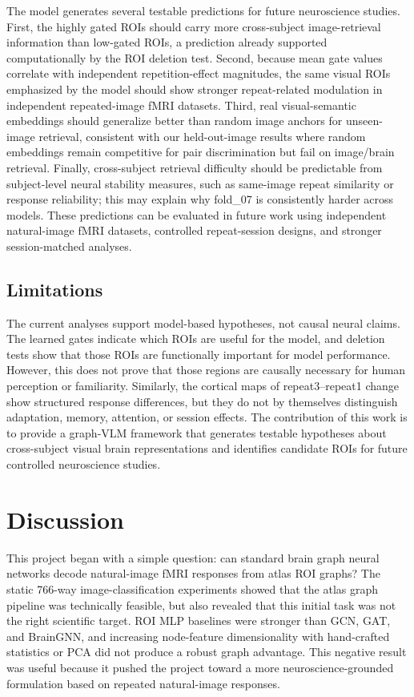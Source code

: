\documentclass{article}
\begin{document}
The model generates several testable predictions for future neuroscience studies. First, the highly gated ROIs should carry more cross-subject image-retrieval information than low-gated ROIs, a prediction already supported computationally by the ROI deletion test. Second, because mean gate values correlate with independent repetition-effect magnitudes, the same visual ROIs emphasized by the model should show stronger repeat-related modulation in independent repeated-image fMRI datasets. Third, real visual-semantic embeddings should generalize better than random image anchors for unseen-image retrieval, consistent with our held-out-image results where random embeddings remain competitive for pair discrimination but fail on image/brain retrieval. Finally, cross-subject retrieval difficulty should be predictable from subject-level neural stability measures, such as same-image repeat similarity or response reliability; this may explain why fold\_07 is consistently harder across models. These predictions can be evaluated in future work using independent natural-image fMRI datasets, controlled repeat-session designs, and stronger session-matched analyses.

\subsection{Limitations}

The current analyses support model-based hypotheses, not causal neural claims. The learned gates indicate which ROIs are useful for the model, and deletion tests show that those ROIs are functionally important for model performance. However, this does not prove that those regions are causally necessary for human perception or familiarity. Similarly, the cortical maps of repeat3--repeat1 change show structured response differences, but they do not by themselves distinguish adaptation, memory, attention, or session effects. The contribution of this work is to provide a graph-VLM framework that generates testable hypotheses about cross-subject visual brain representations and identifies candidate ROIs for future controlled neuroscience studies.

\section{Discussion}
\label{sec:discussion}

This project began with a simple question: can standard brain graph neural networks decode natural-image fMRI responses from atlas ROI graphs? The static 766-way image-classification experiments showed that the atlas graph pipeline was technically feasible, but also revealed that this initial task was not the right scientific target. ROI MLP baselines were stronger than GCN, GAT, and BrainGNN, and increasing node-feature dimensionality with hand-crafted statistics or PCA did not produce a robust graph advantage. This negative result was useful because it pushed the project toward a more neuroscience-grounded formulation based on repeated natural-image responses.
\end{document}
